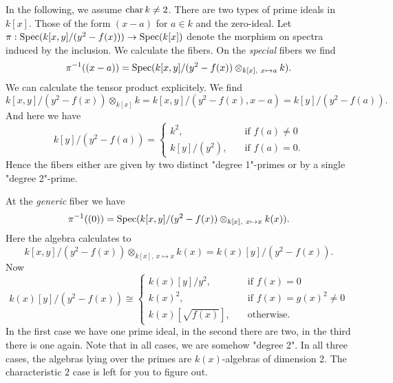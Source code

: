 \documentclass[a4paper,11pt]{article}
\begin{document}
In the following, we assume $\operatorname{char} k \neq 2$. 
There are two types of prime ideals in $k[x]$. Those of the form $(x-a)$
for $a \in k$ and the zero-ideal. Let $\pi: \operatorname{Spec}(k[x,y]/(y^2-f(x))) \to
\operatorname{Spec}(k[x])$ denote the morphism on spectra induced by the inclusion. We
calculate the fibers. On the \textit{special} fibers we find
\begin{equation*}
    \pi^{-1}((x-a)) = \operatorname{Spec}(k[x,y]/(y^2-f(x)) \otimes_{k[x],\ x \mapsto a} k).
\end{equation*}
We can calculate the tensor product explicitely. We find
\begin{equation*}
    k[x,y]/(y^2 - f(x)) \otimes_{k[x]} k = k[x,y]/(y^2-f(x), x-a) = 
    k[y]/(y^2-f(a)).
\end{equation*}
And here we have
\begin{equation*}
    k[y]/(y^2-f(a)) = 
    \begin{cases}
        k^2, \quad &\text{if }f(a) \neq 0\\
        k[y]/(y^2), \quad &\text{if } f(a) = 0.
    \end{cases}
\end{equation*}
Hence the fibers either are given by two distinct "degree 1"-primes or by a 
single "degree 2"-prime.

At the \textit{generic} fiber we have 
\begin{equation*}
    \pi^{-1}((0)) = \operatorname{Spec}(k[x,y]/(y^2-f(x)) \otimes_{k[x],\ x \mapsto x} k(x)).
\end{equation*}
Here the algebra calculates to
\begin{equation*}
    k[x,y]/(y^2-f(x)) \otimes_{k[x],\ x \mapsto x} k(x) = k(x)[y]/(y^2-f(x)).
\end{equation*}
Now
\begin{equation*}
    k(x)[y] / (y^2 - f(x)) \cong \begin{cases}
        k(x)[y]/y^2, \quad &\text{if } f(x) = 0 \\
        k(x)^2, \quad &\text{if } f(x) = g(x)^2 \neq 0\\
        k(x)[\sqrt {f(x)}], \quad &\text{otherwise}.
    \end{cases}
\end{equation*}
In the first case we have one prime ideal, in the second there are two, 
in the third there is one again. Note that in all cases, we are somehow
"degree 2". In all three cases, the algebras lying over the primes
are $k(x)$-algebras of dimension 2. The characteristic $2$ case is left for you 
to figure out.
\end{document}
